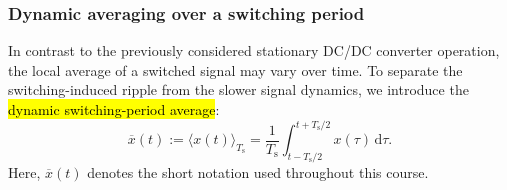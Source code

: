 \begin{frame}
	\frametitle{Dynamic averaging over a switching period}

	In contrast to the previously considered stationary DC/DC
	converter operation, the local average of a switched signal
	may vary over time. To separate the switching-induced ripple
	from the slower signal dynamics, we introduce the
	\hl{dynamic switching-period average}:
	\begin{equation}
		\overline{x}(t) :=
		\langle x(t) \rangle_{T_\mathrm{s}}
		=
		\frac{1}{T_\mathrm{s}}
		\int_{t-T_\mathrm{s}/2}^{t+T_\mathrm{s}/2}
		x(\tau)\,\mathrm{d}\tau.
	\end{equation}
	Here, $\overline{x}(t)$ denotes the short notation
	used throughout this course.

	\begin{figure}
	\end{figure}
\end{frame}

